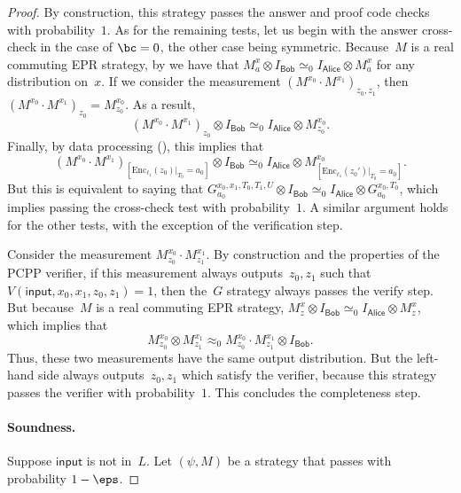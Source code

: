 \documentclass[11pt]{article}
\newcommand{\codee}{\mathrm{Enc}}
\newcommand{\consistency}{\simeq}
\newcommand{\reg}[1]{{\mathsf{#1}}}
\begin{document}
\begin{proof}
By construction, this strategy passes the answer and proof code checks with probability~$1$.
As for the remaining tests, let us begin with the answer cross-check in the case of $\bc = 0$, the other case being symmetric.
Because~$M$ is a real commuting EPR strategy,
by 
we have that $M^x_a \otimes I_{\reg{Bob}} \consistency_0 I_{\reg{Alice}} \otimes M^x_a$ for any distribution on~$x$.
If we consider the measurement $(M^{x_0} \cdot M^{x_1})_{z_0, z_1}$, then $(M^{x_0} \cdot M^{x_1})_{z_0} = M^{x_0}_{z_0}$. As a result,
\begin{equation*}
(M^{x_0} \cdot M^{x_1})_{z_0} \otimes I_{\reg{Bob}}
\consistency_0 I_{\reg{Alice}} \otimes M^{x_0}_{z_0}.
\end{equation*}
Finally, by data processing (), this implies that
\begin{equation*}
(M^{x_0} \cdot M^{x_1})_{[\codee_{\ell_1}(z_0)|_{T_0}=a_0]} \otimes I_{\reg{Bob}}
\consistency_0 I_{\reg{Alice}} \otimes M^{x_0}_{[\codee_{\ell_1}(z_0')|_{T_0} = a_0]}.
\end{equation*}
But this is equivalent to saying that $G^{x_0, x_1, T_0, T_1, U}_{a_0} \otimes I_{\reg{Bob}} \consistency_0 I_{\reg{Alice}} \otimes G^{x_0, T_0}_{a_0}$,
which implies passing the cross-check test with probability~$1$.
A similar argument holds for the other tests, with the exception of the verification step.

Consider the measurement $M^{x_0}_{z_0} \cdot M^{x_1}_{z_1}$.
By construction and the properties of the PCPP verifier, if this measurement always outputs~$z_0, z_1$ such that $V(\mathsf{input}, x_0, x_1, z_0, z_1) = 1$,
then the~$G$ strategy always passes the verify step.
But because~$M$ is a real commuting EPR strategy,
$M^x_z \otimes I_{\reg{Bob}} \consistency_0 I_{\reg{Alice}} \otimes M^x_z$,
which implies that
\begin{equation*}
M^{x_0}_{z_0} \otimes M^{x_1}_{z_1}
\approx_0 M^{x_0}_{z_0} \cdot M^{x_1}_{z_1} \otimes I_{\reg{Bob}}.
\end{equation*}
Thus, these two measurements have the same output distribution.
But the left-hand side always outputs~$z_0, z_1$ which satisfy the verifier, because this strategy passes the verifier with probability~$1$.
This concludes the completeness step.


\paragraph{Soundness.}
Suppose $\mathsf{input}$ is not in~$L$.
Let $(\psi, M)$ be a strategy that passes with probability $1-\eps$.



\end{proof}
\end{document}
